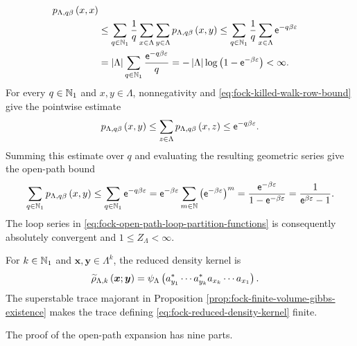 \documentclass[11pt,a4paper]{article}
\theoremstyle{plain}
\theoremstyle{definition}
\theoremstyle{remark}
\begin{document}
\[\begin{aligned}
\fun{p_{\Lambda,q\beta}}{x,x}
\\
& \leq
\sum_{q \in \semigrposint}\frac{1}{q}
\sum_{x \in \Lambda}
\sum_{y \in \Lambda}
\fun{p_{\Lambda,q\beta}}{x,y}
\leq
\sum_{q \in \semigrposint}\frac{1}{q}
\sum_{x \in \Lambda}
\napiernum^{-q\beta\varepsilon}
\\ %
& =
\abscard{\Lambda}
\sum_{q \in \semigrposint}\frac{\napiernum^{-q\beta\varepsilon}}{q}
=
-\abscard{\Lambda}
\log\rbk{1-\napiernum^{-\beta\varepsilon}}
<
\infty.
\end{aligned}\] For every \(q\in\mathbb{N}_1\) and \(x,y\in\Lambda\), nonnegativity and \eqref{eq:fock-killed-walk-row-bound} give the pointwise estimate \[\begin{aligned}
p_{\Lambda,q\beta} \left( x,y \right)
\leq
\sum_{z \in \Lambda}
p_{\Lambda,q\beta} \left( x,z \right)
\leq
\mathsf{e}^{-q\beta\varepsilon}.
\end{aligned}\] Summing this estimate over \(q\) and evaluating the resulting geometric series give the open-path bound \[\begin{aligned}
\sum_{q \in \mathbb{N}_1}p_{\Lambda,q\beta} \left( x,y \right)
\leq
\sum_{q \in \mathbb{N}_1}\mathsf{e}^{-q\beta\varepsilon}
=
\mathsf{e}^{-\beta\varepsilon}
\sum_{m \in \mathbb{N}}
\left( \mathsf{e}^{-\beta\varepsilon} \right)^{m}
=
\frac{\mathsf{e}^{-\beta\varepsilon}}{1-\mathsf{e}^{-\beta\varepsilon}}
=
\frac{1}{\mathsf{e}^{\beta\varepsilon} - 1}.
\end{aligned}\] The loop series in \eqref{eq:fock-open-path-loop-partition-functions} is consequently absolutely convergent and \(1 \leq Z_{\Lambda} < \infty\).

For \(k \in \mathbb{N}_1\) and \(\boldsymbol{x},\boldsymbol{y} \in \Lambda^k\), the reduced density kernel is \begin{equation}
\begin{aligned}
\fun{\widetilde{\rho}_{\Lambda,k}}{\boldsymbol{x};\boldsymbol{y}}
& =
\fun{\oastate[\psi_{\Lambda}]}{
\faadj{a_{y_1}}\cdots\faadj{a_{y_k}}a_{x_k}\cdots a_{x_1}}.
\end{aligned}
\label{eq:fock-reduced-density-kernel}
\end{equation} The superstable trace majorant in Proposition \ref{prop:fock-finite-volume-gibbs-existence} makes the trace defining \eqref{eq:fock-reduced-density-kernel} finite.

The proof of the open-path expansion has nine parts.
\end{document}
